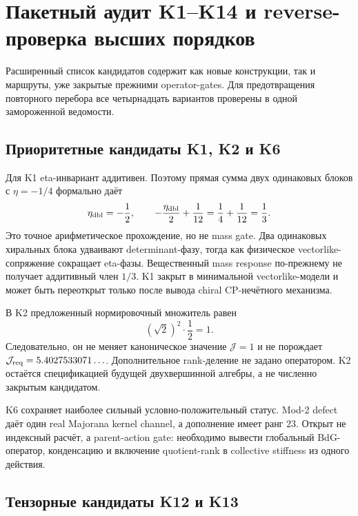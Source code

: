 \chapter{Пакетный аудит K1--K14 и reverse-проверка высших порядков}

Расширенный список кандидатов содержит как новые конструкции, так и
маршруты, уже закрытые прежними operator-gates. Для предотвращения
повторного перебора все четырнадцать вариантов проверены в одной
замороженной ведомости.

\section{Приоритетные кандидаты K1, K2 и K6}

Для K1 eta-инвариант аддитивен. Поэтому прямая сумма двух одинаковых
блоков с \(\eta=-1/4\) формально даёт
\begin{equation}
 \eta_{\rm dbl}=-\frac12,
 \qquad
 -\frac{\eta_{\rm dbl}}2+\frac1{12}
 =\frac14+\frac1{12}=\frac13.
\end{equation}
Это точное арифметическое прохождение, но не mass gate. Два одинаковых
хиральных блока удваивают determinant-фазу, тогда как физическое
vectorlike-сопряжение сокращает eta-фазы. Вещественный mass response
по-прежнему не получает аддитивный член \(1/3\). K1 закрыт в минимальной
vectorlike-модели и может быть переоткрыт только после вывода chiral
CP-нечётного механизма.

В K2 предложенный нормировочный множитель равен
\begin{equation}
 (\sqrt2)^2\cdot\frac12=1.
\end{equation}
Следовательно, он не меняет каноническое значение
\(\mathcal J=1\) и не порождает
\(\mathcal J_{\rm req}=5.4027533071\ldots\). Дополнительное rank-деление
не задано оператором. K2 остаётся спецификацией будущей двухвершинной
алгебры, а не численно закрытым кандидатом.

K6 сохраняет наиболее сильный условно-положительный статус. Mod-2 defect
даёт один real Majorana kernel channel, а дополнение имеет ранг \(23\).
Открыт не индексный расчёт, а parent-action gate: необходимо вывести
глобальный BdG-оператор, конденсацию и включение quotient-rank в collective
stiffness из одного действия.

\section{Тензорные кандидаты K12 и K13}

